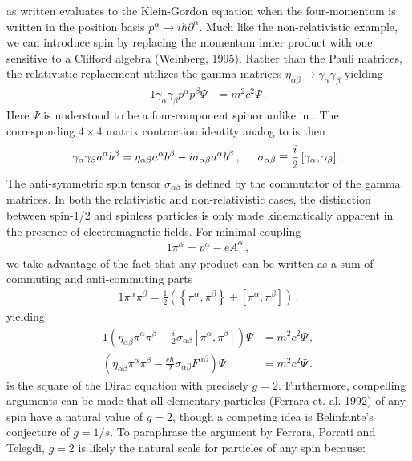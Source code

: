  as written evaluates to the Klein-Gordon equation when the four-momentum is written in the position basis $p^{\alpha}\rightarrow i\hbar\partial^{\alpha}$. Much like the non-relativistic example, we can introduce spin by replacing the momentum inner product with one sensitive to a Clifford algebra (Weinberg, 1995). Rather than the Pauli matrices, the relativistic replacement utilizes the gamma matrices $\eta_{\alpha\beta}\rightarrow\gamma_{\alpha}\gamma_{\beta}$ yielding
\begin{alignat}{1}
	\label{eq:spin:03} \gamma_{\alpha}\gamma_{\beta}p^{\alpha}p^{\beta}\Psi&=m^{2}c^{2}\Psi\,.
\end{alignat}
Here $\Psi$ is understood to be a four-component spinor unlike in . The corresponding $4\times4$ matrix contraction identity analog to  is then
\begin{alignat}{1}
	\label{eq:spin:04} \gamma_{\alpha}\gamma_{\beta}a^{\alpha}b^{\beta}=\eta_{\alpha\beta}a^{\alpha}b^{\beta}-i\sigma_{\alpha\beta}a^{\alpha}b^{\beta}\,,\indent \sigma_{\alpha\beta}\equiv\frac{i}{2}\left[\gamma_{\alpha},\gamma_{\beta}\right]\,.
\end{alignat}
The anti-symmetric spin tensor $\sigma_{\alpha\beta}$ is defined by the commutator of the gamma matrices. In both the relativistic and non-relativistic cases, the distinction between spin-1/2 and spinless particles is only made kinematically apparent in the presence of electromagnetic fields. For minimal coupling
\begin{alignat}{1}
  \label{eq:spin:05} \pi^{\alpha}=p^{\alpha}-eA^{\alpha}\,,
\end{alignat}
we take advantage of the fact that any product can be written as a sum of commuting and anti-commuting parts
\begin{alignat}{1}
	\label{eq:spin:06} \pi^{\alpha}\pi^{\beta}=\frac{1}{2}\left(\left\{\pi^{\alpha},\pi^{\beta}\right\}+\left[\pi^{\alpha},\pi^{\beta}\right]\right)\,.
\end{alignat}
yielding
\begin{alignat}{1}
	\label{eq:spin:07a} \left(\eta_{\alpha\beta}\pi^{\alpha}\pi^{\beta}-\frac{i}{2}\sigma_{\alpha\beta}\left[\pi^{\alpha},\pi^{\beta}\right]\right)\Psi&=m^{2}c^{2}\Psi\,,\\
	\label{eq:spin:07b} \left(\eta_{\alpha\beta}\pi^{\alpha}\pi^{\beta}-\frac{e\hbar}{2}\sigma_{\alpha\beta}F^{\alpha\beta}\right)\Psi&=m^{2}c^{2}\Psi\,.
\end{alignat}
 is the square of the Dirac equation with precisely $g=2$. Furthermore, compelling arguments can be made that all elementary particles (Ferrara et. al. 1992) of any spin have a natural value of $g=2$, though a competing idea is Belinfante's conjecture of $g=1/s$. To paraphrase the argument by Ferrara, Porrati and Telegdi, $g=2$ is likely the natural scale for particles of any spin because:
